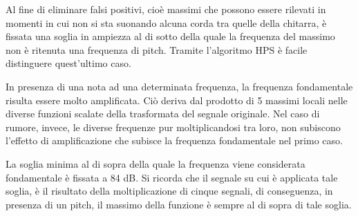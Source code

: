 Al fine di eliminare falsi positivi, cioè massimi che possono essere rilevati in momenti in cui non si sta suonando alcuna corda tra quelle della chitarra, è fissata una soglia in ampiezza al di sotto della quale la frequenza del massimo non è ritenuta una frequenza di pitch.
Tramite l'algoritmo \mbox{HPS} è facile distinguere quest'ultimo caso.

In presenza di una nota ad una determinata frequenza, la frequenza fondamentale risulta essere molto amplificata.
Ciò deriva dal prodotto di 5 massimi locali nelle diverse funzioni scalate della trasformata del segnale originale.
Nel caso di rumore, invece, le diverse frequenze pur moltiplicandosi tra loro, non subiscono l'effetto di amplificazione che subisce la frequenza fondamentale nel primo caso.

La soglia minima al di sopra della quale la frequenza viene considerata fondamentale è fissata a 84 dB.
Si ricorda che il segnale su cui è applicata tale soglia, è il risultato della moltiplicazione di cinque segnali, di conseguenza, in presenza di un pitch, il massimo della funzione è sempre al di sopra di tale soglia.


